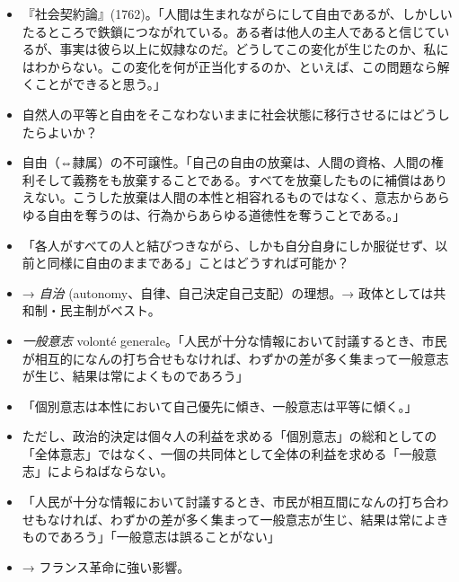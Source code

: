 \documentclass[uplatex,dvipdfmx]{jsarticle} \usepackage{mystyle}%
\begin{document}
  \begin{itemize}


  \item 『社会契約論』(1762)。「人間は生まれながらにして自由であるが、しかしいたるところで鉄鎖につながれている。ある者は他人の主人であると信じているが、事実は彼ら以上に奴隷なのだ。どうしてこの変化が生じたのか、私にはわからない。この変化を何が正当化するのか、といえば、この問題なら解くことができると思う。」

\item 自然人の平等と自由をそこなわないままに社会状態に移行させるにはどうしたらよいか？

\item 自由（⇔隷属）の不可譲性。「自己の自由の放棄は、人間の資格、人間の権利そして義務をも放棄することである。すべてを放棄したものに補償はありえない。こうした放棄は人間の本性と相容れるものではなく、意志からあらゆる自由を奪うのは、行為からあらゆる道徳性を奪うことである。」

\item 「各人がすべての人と結びつきながら、しかも自分自身にしか服従せず、以前と同様に自由のままである」ことはどうすれば可能か？

\item → \emph{自治} (autonomy、自律、自己決定自己支配）の理想。→ 政体としては共和制・民主制がベスト。

\item \emph{一般意志} volont\'{e} generale。「人民が十分な情報において討議するとき、市民が相互的になんの打ち合せもなければ、わずかの差が多く集まって一般意志が生じ、結果は常によくものであろう」

\item 「個別意志は本性において自己優先に傾き、一般意志は平等に傾く。」

\item ただし、政治的決定は個々人の利益を求める「個別意志」の総和としての「全体意志」ではなく、一個の共同体として全体の利益を求める「一般意志」によらねばならない。

\item 「人民が十分な情報において討議するとき、市民が相互間になんの打ち合わせもなければ、わずかの差が多く集まって一般意志が生じ、結果は常によきものであろう」「一般意志は誤ることがない」

\item → フランス革命に強い影響。

\end{itemize}
\end{document}
